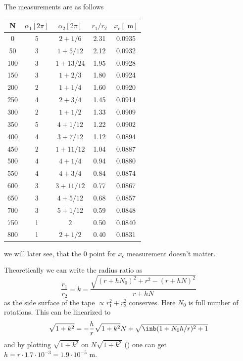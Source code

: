 \newcommand{\inlfrac}[2]{+#1/#2}
The measurements are as follows
\begin{center}
    \begin{tabular}{ c | c | c | c | c}
    N   & $\alpha_1 [2\pi]$ & $\alpha_2 [2\pi]$ & $r_1 / r_2$ & $x_c[\text{ m}]$\\
    \hline
    0   &   5       & $2\inlfrac{1}{6}   $ & 2.31 & 0.0935   \\
    50  &   3       & $1\inlfrac{5}{12}  $ & 2.12 & 0.0932   \\
    100 &   3       & $1\inlfrac{13}{24} $ & 1.95 & 0.0928   \\
    150 &   3       & $1\inlfrac{2}{3}   $ & 1.80 & 0.0924   \\
    200 &   2       & $1\inlfrac{1}{4}   $ & 1.60 & 0.0920   \\
    250 &   4       & $2\inlfrac{3}{4}   $ & 1.45 & 0.0914   \\
    300 &   2       & $1\inlfrac{1}{2}   $ & 1.33 & 0.0909   \\
    350 &   5       & $4\inlfrac{1}{12}  $ & 1.22 & 0.0902   \\
    400 &   4       & $3\inlfrac{7}{12}  $ & 1.12 & 0.0894   \\
    450 &   2       & $1\inlfrac{11}{12} $ & 1.04 & 0.0887   \\
    500 &   4       & $4\inlfrac{1}{4}   $ & 0.94 & 0.0880   \\
    550 &   4       & $4\inlfrac{3}{4}   $ & 0.84 & 0.0874   \\
    600 &   3       & $3\inlfrac{11}{12} $ & 0.77 & 0.0867   \\
    650 &   3       & $4\inlfrac{5}{12}  $ & 0.68 & 0.0857   \\
    700 &   3       & $5\inlfrac{1}{12}  $ & 0.59 & 0.0848   \\
    750 &   1       & $2               $ & 0.50 & 0.0840   \\
    800 &   1       & $2\inlfrac{1}{2}   $ & 0.40 & 0.0831   
    \end{tabular}
\end{center}
we will later see,
that the $0$ point for $x_c$ measurement doesn't matter.

Theoretically we can write the radius ratio as
\begin{equation}
    \frac{r_1}{r_2} = k = \frac{\sqrt{(r + h N_0)^2 + r^2 - (r + h N)^2}}{r + h N}
\end{equation}
as the side surface of the tape $\propto r_1^2 + r_2^2$ conserves.
Here $N_0$ is full number of rotations.
This can be linearized to
\begin{equation}
    \sqrt{1+k^2} = -\frac{h}{r} \sqrt{1+k^2} N + \sqrt{\inb({1+ N_0 h / r})^2 + 1}
\end{equation}
and by plotting $\sqrt{1+k^2}$ on $N \sqrt{1+k^2}$ () one can get
$h = r \cdot 1.7\cdot10^{-3} = 1.9 \cdot 10^{-5} \text{ m}$.

